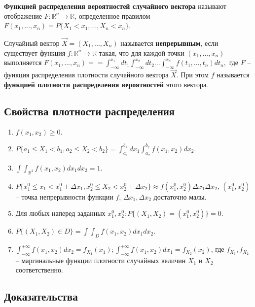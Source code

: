 \textbf{Функцией распределения вероятностей случайного вектора} называют отображение $F: \mathbb{R}^n \rightarrow \mathbb{R}$, определенное правилом $F(x_1, ..., x_n) = P\{X_1 < x_1,..., X_n < x_n\}$.

Случайный вектор $\vec{X} = (X_1,...,X_n)$ называется \textbf{непрерывным}, если существует функция $f: \mathbb{R}^n \rightarrow \mathbb{R}$ такая, что для каждой точки $(x_1,...,x_n)$ выполняется $F(x_1,...,x_n) =$\newline$= \int_{-\infty}^{x_1}dt_1 \int_{-\infty}^{x_2}dt_2 ... \int_{-\infty}^{x_n}f(t_1,...,t_n)dt_n,$ где $F$ -- функция распределения плотности случайного вектора $\vec{X}$. При этом $f$ называется \textbf{функцией плотности распределения вероятностей} этого вектора.

\subsection*{Свойства плотности распределения}
\begin{enumerate}
	\item $f(x_1, x_2) \geq 0$.
	
	\item $P\{a_1\leq X_1 < b_1, a_2 \leq X_2 < b_2\} = \int_{a_1}^{b_1}dx_1\int_{a_2}^{b_2}f(x_1, x_2)dx_2$.
	
	\item $\int\int_{\mathbb{R}^2}f(x_1, x_2)dx_1dx_2=1$.
	
	\item $P\{x_1^0 \leq x_1 < x_1^0 + \Delta x_1, x_2^0 \leq X_2 < x_2^0 + \Delta x_2\} \approx f(x_1^0, x_2^0) \Delta x_1 \Delta x_2$, $(x_1^0, x_2^0)$ -- точка непрерывности функции $f$, $\Delta x_1, \Delta x_2$ достаточно малы. 
		
	\item Для любых наперед заданных $x_1^0, x_2^0: P\{(X_1, X_2) = (x_1^0, x_2^0)\} = 0$.
		
	\item $P\{(X_1, X_2) \in D\} = \int\int_{D}f(x_1, x_2)dx_1dx_2$.
	
	\item $\int_{-\infty}^{+\infty}f(x_1,x_2)dx_2 = f_{X_1}(x_1); \int_{-\infty}^{+\infty}f(x_1,x_2)dx_1 = f_{X_2}(x_2)$, где $f_{X_1}, f_{X_2}$ -- маргинальные функции плотности случайных величин $X_1$ и $X_2$ соответственно.
\end{enumerate}

\subsection*{Доказательства}


